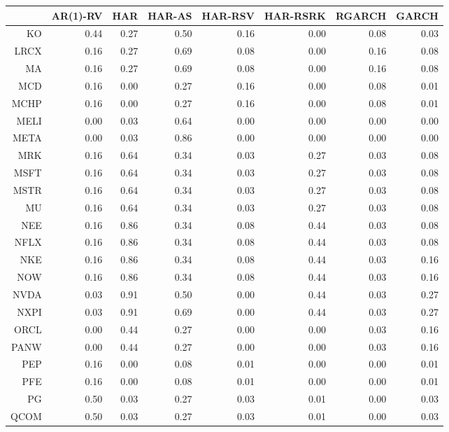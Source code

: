 \begin{table}[ht]
\centering
\begin{tabular}{rrrrrrrr}
  \hline
 & AR(1)-RV & HAR & HAR-AS & HAR-RSV & HAR-RSRK & RGARCH & GARCH \\ 
  \hline
KO & 0.44 & 0.27 & 0.50 & 0.16 & 0.00 & 0.08 & 0.03 \\ 
  LRCX & 0.16 & 0.27 & 0.69 & 0.08 & 0.00 & 0.16 & 0.08 \\ 
  MA & 0.16 & 0.27 & 0.69 & 0.08 & 0.00 & 0.16 & 0.08 \\ 
  MCD & 0.16 & 0.00 & 0.27 & 0.16 & 0.00 & 0.08 & 0.01 \\ 
  MCHP & 0.16 & 0.00 & 0.27 & 0.16 & 0.00 & 0.08 & 0.01 \\ 
  MELI & 0.00 & 0.03 & 0.64 & 0.00 & 0.00 & 0.00 & 0.00 \\ 
  META & 0.00 & 0.03 & 0.86 & 0.00 & 0.00 & 0.00 & 0.00 \\ 
  MRK & 0.16 & 0.64 & 0.34 & 0.03 & 0.27 & 0.03 & 0.08 \\ 
  MSFT & 0.16 & 0.64 & 0.34 & 0.03 & 0.27 & 0.03 & 0.08 \\ 
  MSTR & 0.16 & 0.64 & 0.34 & 0.03 & 0.27 & 0.03 & 0.08 \\ 
  MU & 0.16 & 0.64 & 0.34 & 0.03 & 0.27 & 0.03 & 0.08 \\ 
  NEE & 0.16 & 0.86 & 0.34 & 0.08 & 0.44 & 0.03 & 0.08 \\ 
  NFLX & 0.16 & 0.86 & 0.34 & 0.08 & 0.44 & 0.03 & 0.08 \\ 
  NKE & 0.16 & 0.86 & 0.34 & 0.08 & 0.44 & 0.03 & 0.16 \\ 
  NOW & 0.16 & 0.86 & 0.34 & 0.08 & 0.44 & 0.03 & 0.16 \\ 
  NVDA & 0.03 & 0.91 & 0.50 & 0.00 & 0.44 & 0.03 & 0.27 \\ 
  NXPI & 0.03 & 0.91 & 0.69 & 0.00 & 0.44 & 0.03 & 0.27 \\ 
  ORCL & 0.00 & 0.44 & 0.27 & 0.00 & 0.00 & 0.03 & 0.16 \\ 
  PANW & 0.00 & 0.44 & 0.27 & 0.00 & 0.00 & 0.03 & 0.16 \\ 
  PEP & 0.16 & 0.00 & 0.08 & 0.01 & 0.00 & 0.00 & 0.01 \\ 
  PFE & 0.16 & 0.00 & 0.08 & 0.01 & 0.00 & 0.00 & 0.01 \\ 
  PG & 0.50 & 0.03 & 0.27 & 0.03 & 0.01 & 0.00 & 0.03 \\ 
  QCOM & 0.50 & 0.03 & 0.27 & 0.03 & 0.01 & 0.00 & 0.03 \\ 

\end{tabular}
\end{table}
